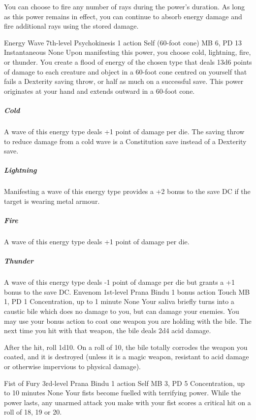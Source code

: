 You can choose to fire any number of rays during the power's
duration. As long as this power remains in effect, you can
continue to absorb energy damage and fire additional rays
using the stored damage.

\DndPowerHeader%
    {Energy Wave\label{pwr:energy_wave}}
    {7th-level Psychokinesis}
    {1 action}
    {Self (60-foot cone)}
    {MB 6, PD 13}
    {Instantaneous}
    {None}
Upon manifesting this power,
you choose cold, lightning, fire, or thunder.
You create a flood of energy of the chosen type
that deals 13d6 points of damage
to each creature and object in a 60-foot cone
centred on yourself that fails a Dexterity saving throw,
or half as much on a successful save.
This power originates at your hand
and extends outward in a 60-foot cone.

\subparagraph{Cold}
A wave of this energy type deals +1 point
of damage per die.
The saving throw to reduce damage from a cold wave
is a Constitution save instead of a Dexterity save.  

\subparagraph{Lightning}
Manifesting a wave of this energy type
provides a +2 bonus to the save DC if the target is wearing
metal armour.

\subparagraph{Fire}
A wave of this energy type deals +1 point of damage per die.

\subparagraph{Thunder}
A wave of this energy type deals -1 point of damage per die
but grants a +1 bonus to the save DC.
\DndPowerHeader%
    {Envenom\label{pwr:envenom}}
    {1st-level Prana Bindu}
    {1 bonus action}
    {Touch}
    {MB 1, PD 1}
    {Concentration, up to 1 minute}
    {None}
Your saliva briefly turns into a caustic
bile which does no damage to you, but can damage your enemies.
You may use your bonus action to coat one weapon you are holding
with the bile. The next time you hit with that weapon, the
bile deals 2d4 acid damage.

After the hit, roll 1d10. On a roll of 10, the bile totally
corrodes the weapon you coated, and it is destroyed (unless
it is a magic weapon, resistant to acid damage or otherwise
impervious to physical damage).

\DndPowerHeader%
    {Fist of Fury\label{pwr:fist_of_fury}}
    {3rd-level Prana Bindu}
    {1 action}
    {Self}
    {MB 3, PD 5}
    {Concentration, up to 10 minutes}
    {None}
Your fists become fuelled with terrifying
power. While the power lasts, any unarmed attack you make
with your fist scores a critical hit on a roll of 18, 19 or
20.

